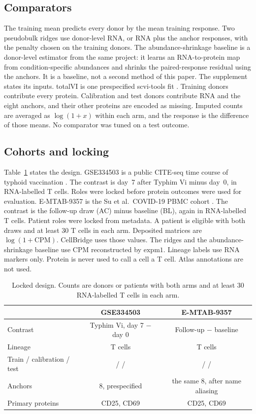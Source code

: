 \documentclass[10pt,a4paper]{article}
\begin{document}
\subsection{Comparators}
The training mean predicts every donor by the mean training response. Two pseudobulk ridges use donor-level RNA, or RNA plus the anchor responses, with the penalty chosen on the training donors. The abundance-shrinkage baseline is a donor-level estimator from the same project: it learns an RNA-to-protein map from condition-specific abundances and shrinks the paired-response residual using the anchors. It is a baseline, not a second method of this paper. The supplement states its inputs. totalVI is one prespecified scvi-tools fit \citep{gayoso2021}. Training donors contribute every protein. Calibration and test donors contribute RNA and the eight anchors, and their other proteins are encoded as missing. Imputed counts are averaged as \(\log(1+x)\) within each arm, and the response is the difference of those means. No comparator was tuned on a test outcome.

\subsection{Cohorts and locking}
Table~\ref{tab:cohorts} states the design. GSE334503 is a public CITE-seq time course of typhoid vaccination \citep{savi2026}. The contrast is day~7 after Typhim Vi minus day~0, in RNA-labelled T cells. Roles were locked before protein outcomes were used for evaluation. E-MTAB-9357 is the Su et al.\ COVID-19 PBMC cohort \citep{su2020}. The contrast is the follow-up draw (AC) minus baseline (BL), again in RNA-labelled T cells. Patient roles were locked from metadata. A patient is eligible with both draws and at least 30 T cells in each arm. Deposited matrices are \(\log(1+\mathrm{CPM})\). CellBridge uses those values. The ridges and the abundance-shrinkage baseline use CPM reconstructed by \(\mathrm{expm1}\). Lineage labels use RNA markers only. Protein is never used to call a cell a T cell. Atlas annotations are not used.

\begin{table}[t]
\centering
\caption{Locked design. Counts are donors or patients with both arms and at least 30 RNA-labelled T cells in each arm.}
\label{tab:cohorts}
\begin{tabular}{@{}lcc@{}}
\toprule
 & GSE334503 & E-MTAB-9357 \\
\midrule
Contrast & Typhim Vi, day 7 \(-\) day 0 & Follow-up \(-\) baseline \\
Lineage & T cells & T cells \\
Train / calibration / test & \NGseTrain{} / \NGseCal{} / \NGseTest{} & \NEmTrain{} / \NEmCal{} / \NEmTest{} \\
Anchors & 8, prespecified & the same 8, after name aliasing \\
Primary proteins & CD25, CD69 & CD25, CD69 \\
\bottomrule
\end{tabular}
\end{table}
\end{document}

